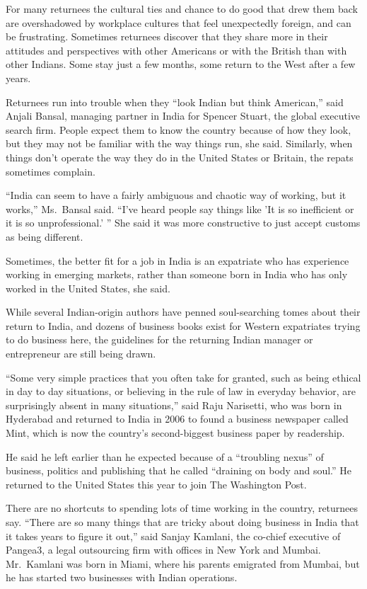 ﻿\documentclass[12pt]{article}
\begin{document}
For many returnees the cultural ties and chance to do good that drew them back are overshadowed by
workplace cultures that feel unexpectedly foreign, and can be frustrating. Sometimes returnees
discover that they share more in their attitudes and perspectives with other Americans or with the
British than with other Indians. Some stay just a few months, some return to the West after a few
years.

Returnees run into trouble when they ``look Indian but think American,'' said Anjali Bansal,
managing partner in India for Spencer Stuart, the global executive search firm. People expect them
to know the country because of how they look, but they may not be familiar with the way things run,
she said. Similarly, when things don't operate the way they do in the United States or Britain, the
repats sometimes complain.

``India can seem to have a fairly ambiguous and chaotic way of working, but it works,'' Ms.~Bansal
said. ``I've heard people say things like 'It is so inefficient or it is so unprofessional.' '' She
said it was more constructive to just accept customs as being different.

Sometimes, the better fit for a job in India is an expatriate\cite{expatriate} who has experience
working in emerging markets, rather than someone born in India who has only worked in the United
States, she said.

While several Indian-origin authors have penned soul-searching tomes about their return to India,
and dozens of business books exist for Western expatriates trying to do business here, the
guidelines for the returning Indian manager or entrepreneur are still being drawn.

``Some very simple practices that you often take for granted, such as being ethical\cite{ethical} in
day to day situations, or believing in the rule of law in everyday behavior, are surprisingly absent
in many situations,'' said Raju Narisetti, who was born in Hyderabad and returned to India in 2006
to found a business newspaper called Mint, which is now the country's second-biggest business paper
by readership.

He said he left earlier than he expected because of a ``troubling nexus'' of business, politics and
publishing that he called ``draining on body and soul.'' He returned to the United States this year
to join The Washington Post.

There are no shortcuts to spending lots of time working in the country, returnees say. ``There are
so many things that are tricky about doing business in India that it takes years to figure it out,''
said Sanjay Kamlani, the co-chief executive of Pangea3, a legal outsourcing firm with offices in New
York and Mumbai. Mr.~Kamlani was born in Miami, where his parents emigrated from Mumbai, but he has
started two businesses with Indian operations.
\end{document}
